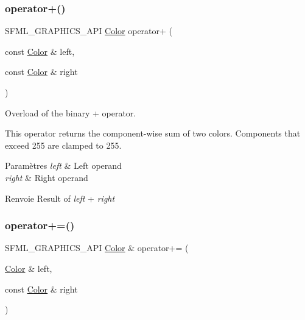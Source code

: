 \subsubsection{\texorpdfstring{operator+()}{operator+()}}
{\footnotesize\ttfamily S\+F\+M\+L\+\_\+\+G\+R\+A\+P\+H\+I\+C\+S\+\_\+\+A\+PI \hyperlink{classsf_1_1Color}{Color} operator+ (\begin{DoxyParamCaption}\item[{const \hyperlink{classsf_1_1Color}{Color} \&}]{left,  }\item[{const \hyperlink{classsf_1_1Color}{Color} \&}]{right }\end{DoxyParamCaption})\hspace{0.3cm}{\ttfamily [related]}}



Overload of the binary + operator. 

This operator returns the component-\/wise sum of two colors. Components that exceed 255 are clamped to 255.


\begin{DoxyParams}{Paramètres}
{\em left} & Left operand \\
\hline
{\em right} & Right operand\\
\hline
\end{DoxyParams}
\begin{DoxyReturn}{Renvoie}
Result of {\itshape left} + {\itshape right} 
\end{DoxyReturn}
\mbox{\label{classsf_1_1Color_a19917f2453a4acfd69de2539bfab8031}} 
\subsubsection{\texorpdfstring{operator+=()}{operator+=()}}
{\footnotesize\ttfamily S\+F\+M\+L\+\_\+\+G\+R\+A\+P\+H\+I\+C\+S\+\_\+\+A\+PI \hyperlink{classsf_1_1Color}{Color} \& operator+= (\begin{DoxyParamCaption}\item[{\hyperlink{classsf_1_1Color}{Color} \&}]{left,  }\item[{const \hyperlink{classsf_1_1Color}{Color} \&}]{right }\end{DoxyParamCaption})\hspace{0.3cm}{\ttfamily [related]}}



